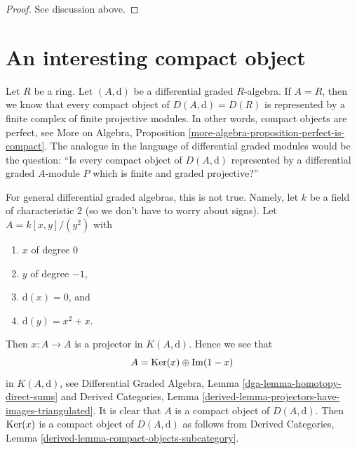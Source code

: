 \begin{proof}
See discussion above.
\end{proof}




\section{An interesting compact object}
\label{section-interesting-compact}


\noindent
Let $R$ be a ring. Let $(A, \text{d})$ be a differential graded $R$-algebra.
If $A = R$, then we know that every compact object of $D(A, \text{d}) = D(R)$
is represented by a finite complex of finite projective modules. In other
words, compact objects are perfect, see
More on Algebra, Proposition \ref{more-algebra-proposition-perfect-is-compact}.
The analogue in the language of differential graded modules would
be the question: ``Is every compact object of $D(A, \text{d})$ represented
by a differential graded $A$-module $P$ which is finite and
graded projective?''

\medskip\noindent
For general differential graded algebras, this is not true. Namely,
let $k$ be a field of characteristic $2$
(so we don't have to worry about signs).
Let $A = k[x, y]/(y^2)$
with
\begin{enumerate}
\item $x$ of degree $0$
\item $y$ of degree $-1$,
\item $\text{d}(x) = 0$, and
\item $\text{d}(y) = x^2 + x$.
\end{enumerate}
Then $x : A \to A$ is a projector in $K(A, \text{d})$.
Hence we see that
$$
A = \mathop{\mathrm{Ker}}(x) \oplus \mathop{\mathrm{Im}}(1 - x)
$$
in $K(A, \text{d})$, see
Differential Graded Algebra, Lemma \ref{dga-lemma-homotopy-direct-sums} and
Derived Categories, Lemma
\ref{derived-lemma-projectors-have-images-triangulated}.
It is clear that $A$ is a compact object of $D(A, \text{d})$.
Then $\mathop{\mathrm{Ker}}(x)$ is a compact object of $D(A, \text{d})$
as follows from
Derived Categories, Lemma \ref{derived-lemma-compact-objects-subcategory}.

